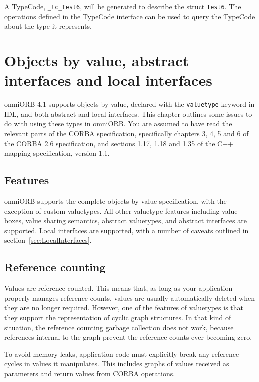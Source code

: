\documentclass[11pt,twoside,a4paper]{book}
\newcommand{\type}[1]{\texttt{#1}}
\newcommand{\code}[1]{\texttt{#1}}
\begin{document}
A TypeCode, \code{\_tc\_Test6}, will be generated to describe the
struct \type{Test6}. The operations defined in the TypeCode interface
can be used to query the TypeCode about the type it represents.


\chapter[Objects by value, etc.]
  {Objects by value, abstract interfaces and local interfaces}
\label{chap:valuetype}

omniORB 4.1 supports objects by value, declared with the
\code{valuetype} keyword in IDL, and both abstract and local
interfaces. This chapter outlines some issues to do with using these
types in omniORB. You are assumed to have read the relevant parts of
the CORBA specification, specifically chapters 3, 4, 5 and 6 of the
CORBA 2.6 specification, and sections 1.17, 1.18 and 1.35 of the C++
mapping specification, version 1.1.


\section{Features}

omniORB supports the complete objects by value specification, with the
exception of custom valuetypes. All other valuetype features including
value boxes, value sharing semantics, abstract valuetypes, and
abstract interfaces are supported. Local interfaces are supported,
with a number of caveats outlined in
section~\ref{sec:LocalInterfaces}.


\section{Reference counting}

Values are reference counted. This means that, as long as your
application properly manages reference counts, values are usually
automatically deleted when they are no longer required. However, one
of the features of valuetypes is that they support the representation
of cyclic graph structures. In that kind of situation, the reference
counting garbage collection does not work, because references internal
to the graph prevent the reference counts ever becoming zero.

To avoid memory leaks, application code must explicitly break any
reference cycles in values it manipulates. This includes graphs of
values received as parameters and return values from CORBA operations.
\end{document}

